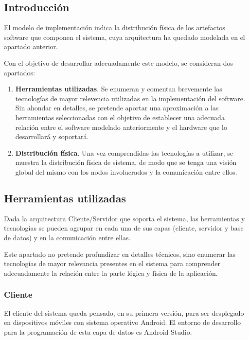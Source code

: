 \subsection{Introducción}

El modelo de implementación indica la distribución física de los artefactos software que componen el sistema, cuya arquitectura ha quedado modelada en el apartado anterior.

Con el objetivo de desarrollar adecuadamente este modelo, se consideran dos apartados:

\begin{enumerate}
	\item{\textbf{Herramientas utilizadas}. Se enumeran y comentan brevemente las tecnologías de mayor relevencia utilizadas en la implementación del software. Sin ahondar en detalles, se pretende aportar una aproximación a las herramientas seleccionadas con el objetivo de establecer una adecuada relación entre el software modelado anteriormente y el hardware que lo desarrollará y soportará}.
	\item{\textbf{Distribución física}. Una vez comprendidas las tecnologías a utilizar, se muestra la distribución física de sistema, de modo que se tenga una visión global del mismo con los nodos involucrados y la comunicación entre ellos}.
\end{enumerate}

\subsection{Herramientas utilizadas}
\label{subsec:herramientasImp}

Dada la arquitectura Cliente/Servidor que soporta el sistema, las herramientas y tecnologías se pueden agrupar en cada una de sus capas (cliente, servidor y base de datos) y en la comunicación entre ellas. 

Este apartado no pretende profundizar en detalles técnicos, sino enumerar las tecnologías de mayor relevancia presentes en el sistema para comprender adecuadamente la relación entre la parte lógica y física de la aplicación.

\subsubsection{Cliente}

El cliente del sistema queda pensado, en su primera versión, para ser desplegado en dispositivos móviles con sistema operativo Android. El entorno de desarrollo para la programación de esta capa de datos es Android Studio.

